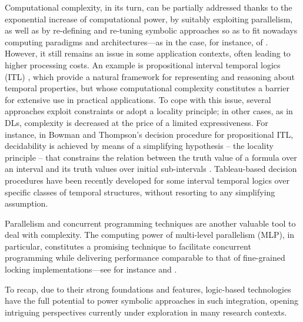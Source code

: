 \documentclass[12pt,a4paper,openright,twoside]{book}
\begin{document}
Computational complexity, in its turn, can be partially addressed thanks to the exponential increase of computational power, by suitably exploiting  parallelism, as well as by re-defining and re-tuning symbolic approaches so as to fit nowadays computing paradigms and architectures---as in the case, for instance, of \lpaas{} \cite{lpaas-tplp18}.
%
However, it still remains an issue in some application contexts, often leading to higher processing costs.
%
An example is propositional interval temporal logics (ITL) \cite{goranko2004}, which provide a natural framework for representing and reasoning about temporal properties, but whose computational complexity constitutes a barrier for extensive use in practical applications.
%
To cope with this issue, several approaches exploit constraints or adopt a locality principle; in other cases, as in DLs, complexity is decreased at the price of a limited expressiveness.
%
For instance, in Bowman and Thompson’s decision procedure for propositional ITL, decidability is achieved by means of a simplifying hypothesis -- the locality principle -- that constrains the relation between the truth value of a formula over an interval and its truth values over initial sub-intervals \cite{holldobler2008}.
%
Tableau-based decision procedures have been recently developed \cite{dellaMonica2013} for some interval temporal logics over specific classes of temporal structures, without resorting to any simplifying assumption.

Parallelism and concurrent programming techniques are another valuable tool to deal with complexity.
%
The computing power of multi-level parallelism (MLP), in particular, constitutes a promising technique to facilitate concurrent programming while delivering performance comparable to that of fine-grained locking implementations---see for instance \cite{larus2007} and \cite{jacobsen2013}.

To recap, due to their strong foundations and features, logic-based technologies have the full potential to power symbolic approaches in such integration, opening intriguing perspectives currently under exploration in many research contexts.
%
\end{document}
